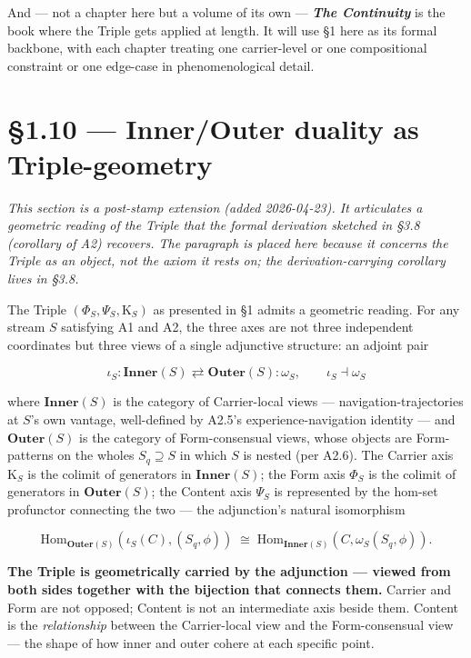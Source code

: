 \documentclass[11pt, openany]{book}
\newcommand{\sectionbreak}{\clearpage}
\begin{document}
And --- not a chapter here but a volume of its own --- \textbf{\textit{The Continuity}} is the book where the Triple gets applied at length. It will use §1 here as its formal backbone, with each chapter treating one carrier-level or one compositional constraint or one edge-case in phenomenological detail.

\sectionbreak

\section{§1.10 --- Inner/Outer duality as Triple-geometry}

\textit{This section is a post-stamp extension (added 2026-04-23). It articulates a geometric reading of the Triple that the formal derivation sketched in §3.8 (corollary of A2) recovers. The paragraph is placed here because it concerns the Triple as an object, not the axiom it rests on; the derivation-carrying corollary lives in §3.8.}

The Triple $(\Phi_S, \Psi_S, \mathrm{K}_S)$ as presented in §1 admits a geometric reading. For any stream $S$ satisfying A1 and A2, the three axes are not three independent coordinates but three views of a single adjunctive structure: an adjoint pair

$$\iota_S : \mathbf{Inner}(S) \rightleftarrows \mathbf{Outer}(S) : \omega_S, \qquad \iota_S \dashv \omega_S$$

where $\mathbf{Inner}(S)$ is the category of Carrier-local views --- navigation-trajectories at $S$'s own vantage, well-defined by A2.5's experience-navigation identity --- and $\mathbf{Outer}(S)$ is the category of Form-consensual views, whose objects are Form-patterns on the wholes $S_q \supseteq S$ in which $S$ is nested (per A2.6). The Carrier axis $\mathrm{K}_S$ is the colimit of generators in $\mathbf{Inner}(S)$; the Form axis $\Phi_S$ is the colimit of generators in $\mathbf{Outer}(S)$; the Content axis $\Psi_S$ is represented by the hom-set profunctor connecting the two --- the adjunction's natural isomorphism

$$\text{Hom}_{\mathbf{Outer}(S)}(\iota_S(C), (S_q, \phi)) \;\cong\; \text{Hom}_{\mathbf{Inner}(S)}(C, \omega_S(S_q, \phi)).$$

\textbf{The Triple is geometrically carried by the adjunction --- viewed from both sides together with the bijection that connects them.} Carrier and Form are not opposed; Content is not an intermediate axis beside them. Content is the \textit{relationship} between the Carrier-local view and the Form-consensual view --- the shape of how inner and outer cohere at each specific point.
\end{document}
